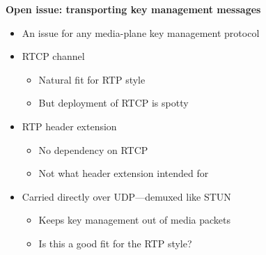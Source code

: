 \documentclass[helvetica,fancybox,landscape]{seminar}
\newcommand{\heading}[1]{%
  \begin{center} 
    \large\bf 
    #1 
  \end{center} 
  \vspace{.4 in}}
\begin{document}
\begin{slide}
\heading{Open issue: transporting key management messages}

\vspace{-.3 in}
\begin{itemize}
\item An issue for any media-plane key management protocol
\item RTCP channel
\begin{itemize}
\item Natural fit for RTP style
\item But deployment of RTCP is spotty
\end{itemize}
\item RTP header extension
\begin{itemize}
\item No dependency on RTCP
\item Not what header extension intended for
\end{itemize}
\item Carried directly over UDP---demuxed like STUN
\begin{itemize}
\item Keeps key management out of media packets
\item Is this a good fit for the RTP style?
\end{itemize}
\end{itemize}
\end{slide}
\end{document}
